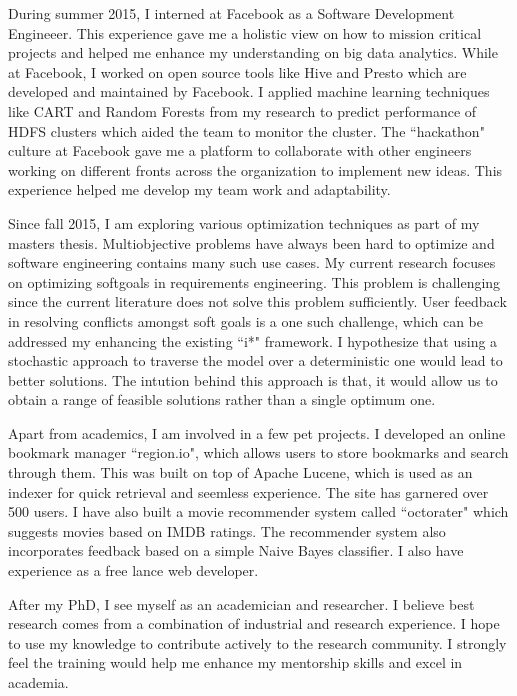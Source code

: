 \documentclass{article}
\begin{document}
\bigskip
During summer 2015, I interned at Facebook as a Software Development Engineeer. This experience gave me a holistic view on how to mission critical projects and helped me enhance my understanding on big data analytics. While at Facebook, I worked on open source tools like Hive and Presto which are developed and maintained by Facebook. I applied machine learning techniques like CART and Random Forests from my research to predict performance of HDFS clusters which aided the team to monitor the cluster. The ``hackathon" culture at Facebook gave me a platform to collaborate with other engineers working on different fronts across the organization to implement new ideas. This experience helped me develop my team work and adaptability. 

\bigskip
Since fall 2015, I am exploring various optimization techniques as part of my masters thesis. Multiobjective problems have always been hard to optimize and software engineering contains many such use cases. My current research focuses on optimizing softgoals in requirements engineering. This problem is challenging since the current literature does not solve this problem sufficiently. User feedback in resolving conflicts amongst soft goals is a one such challenge, which can be addressed my enhancing the existing ``i*" framework. I hypothesize that using a stochastic approach to traverse the model over a deterministic one would lead to better solutions. The intution behind this approach is that, it would allow us to obtain a range of feasible solutions rather than a single optimum one.

\bigskip
Apart from academics, I am involved in a few pet projects. I developed an online bookmark manager ``region.io", which allows users to store bookmarks and search through them. This was built on top of Apache Lucene, which is used as an indexer for quick retrieval and seemless experience. The site has garnered over 500 users. I have also built a movie recommender system called ``octorater" which suggests movies based on IMDB ratings. The recommender system also incorporates feedback based on a simple Naive Bayes classifier. I also have experience as a free lance web developer.

\bigskip
After my PhD, I see myself as an academician and researcher. I believe best research comes from a combination of industrial and research experience. I hope to use my knowledge to contribute actively to the research community. I strongly feel the training would help me enhance my mentorship skills and excel in academia.
\end{document}
